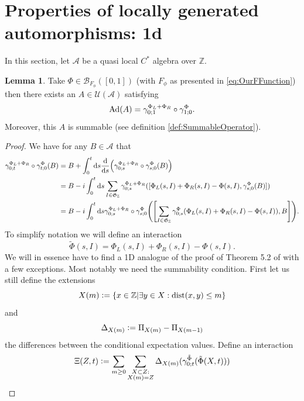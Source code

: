 \documentclass[12pt,a4paper,twoside]{article}
\renewcommand{\d}{\text{d}}
\newcommand{\defeq}{\vcentcolon=}
\let\originalleft\left
\let\originalright\right
\renewcommand{\left}{\mathopen{}\mathclose\bgroup\originalleft}
\renewcommand{\right}{\aftergroup\egroup\originalright}
\newcommand{\UU}{\mathcal U}
\newcommand{\BB}{\mathcal B}
\newcommand{\ZZ}{\mathbb Z}
\renewcommand{\AA}{\mathcal A}
\newcommand{\Ad}[1]{\textrm{Ad}\left(#1\right)}
\theoremstyle{definition}
\newtheorem{lemma}[theorem]{Lemma}
\numberwithin{equation}{section}
\begin{document}
\section{Properties of locally generated automorphisms: 1d}
In this section, let $\AA$ be a quasi local $C^*$ algebra over $\ZZ$.
\begin{lemma}\label{lem:PropertiesLocallyGeneratedAutomorphisms1d}
	Take $\Phi\in\BB_{F_\phi}([0,1])$ (with $F_\phi$ as presented in \eqref{eq:OurFFunction}) then there exists an $A\in\UU(\AA)$ satisfying
	\begin{equation}
		\Ad{A}=\gamma^{\Phi_L+\Phi_R}_{0;1}\circ\gamma^\Phi_{1;0}.
	\end{equation}
	Moreover, this $A$ is summable (see definition \ref{def:SummableOperator}).
\end{lemma}
\begin{proof}
	We have for any $B\in\AA$ that
	\begin{align}
		\gamma^{\Phi_L+\Phi_R}_{0;t}\circ\gamma^\Phi_{t;0}(B)&=B+\int_{0}^{t}\d s\frac{\d}{\d s}\left(\gamma^{\Phi_L+\Phi_R}_{0;s}\circ\gamma^\Phi_{s;0}(B)\right)\\
		&=B-i\int_{0}^{t}\d s\sum_{I\in\mathfrak{G}_\ZZ}\gamma^{\Phi_L+\Phi_R}_{0;s}([\Phi_L(s,I)+\Phi_R(s,I)-\Phi(s,I),\gamma^{\Phi}_{s;0}(B)])\\
		\label{eq:EquationShowingBounded_H}
		&=B-i\int_{0}^{t}\d s\gamma^{\Phi_L+\Phi_R}_{0;s}\circ\gamma^{\Phi}_{s;0}\left(\left[\sum_{I\in\mathfrak{G}_\ZZ}\gamma^{\Phi}_{0;s}(\Phi_L(s,I)+\Phi_R(s,I)-\Phi(s,I)),B\right]\right).
	\end{align}
	To simplify notation we will define an interaction
	\begin{equation}
		\tilde\Phi(s,I)=\Phi_L(s,I)+\Phi_R(s,I)-\Phi(s,I).
	\end{equation}
	We will in essence have to find a 1D analogue of the proof of Theorem 5.2 of \cite{ogata2021h3gmathbb} with a few exceptions. Most notably we need the summability condition. First let us still define the extensions
	\begin{equation}
		X(m)\defeq \{x\in\ZZ|\exists y\in X:\textrm{dist}(x,y)\leq m\}
	\end{equation}
	and
	\begin{equation}
		\Delta_{X(m)}\defeq \Pi_{X(m)}-\Pi_{X(m-1)}
	\end{equation}
	the differences between the conditional expectation values. Define an interaction
	\begin{equation}
		\Xi(Z,t)\defeq\sum_{m\geq 0}\sum_{\substack{X\subset Z:\\X(m)=Z}}\Delta_{X(m)}(\gamma^{\tilde{\Phi}}_{0;t}(\tilde{\Phi}(X,t)))

\end{equation}
\end{proof}
\end{document}
